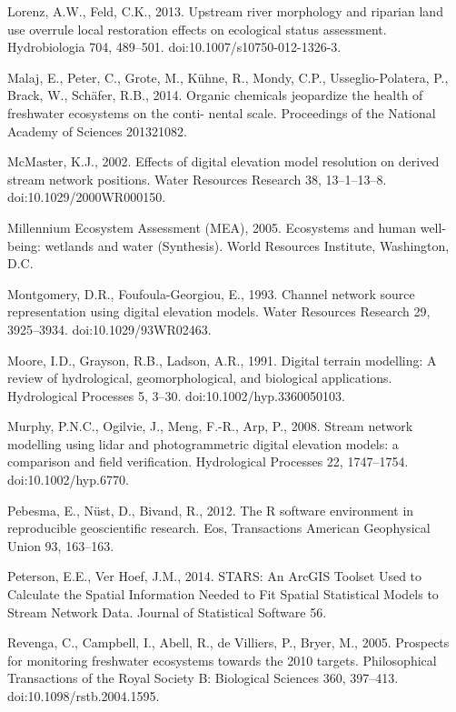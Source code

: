 \begin{thebibliography}
\bibitem{} \hangindent=1cm Lorenz, A.W., Feld, C.K., 2013. Upstream river morphology and riparian land use overrule local restoration effects on ecological status assessment. Hydrobiologia 704, 489–501. doi:10.1007/s10750-012-1326-3.

\bibitem{} \hangindent=1cm Malaj, E., Peter, C., Grote, M., Kühne, R., Mondy, C.P., Usseglio-Polatera, P., Brack, W., Schäfer, R.B., 2014. Organic chemicals jeopardize the health of freshwater ecosystems on the conti- nental scale. Proceedings of the National Academy of Sciences 201321082.

\bibitem{} \hangindent=1cm McMaster, K.J., 2002. Effects of digital elevation model resolution on derived stream network positions. Water Resources Research 38, 13–1–13–8. doi:10.1029/2000WR000150.

\bibitem{} \hangindent=1cm Millennium Ecosystem Assessment (MEA), 2005. Ecosystems and human well-being: wetlands and water (Synthesis). World Resources Institute, Washington, D.C.

\bibitem{} \hangindent=1cm Montgomery, D.R., Foufoula-Georgiou, E., 1993. Channel network source representation using digital elevation models. Water Resources Research 29, 3925–3934. doi:10.1029/93WR02463.

\bibitem{} \hangindent=1cm Moore, I.D., Grayson, R.B., Ladson, A.R., 1991. Digital terrain modelling: A review of hydrological, geomorphological, and biological applications. Hydrological Processes 5, 3–30. doi:10.1002/hyp.3360050103.

\bibitem{} \hangindent=1cm Murphy, P.N.C., Ogilvie, J., Meng, F.-R., Arp, P., 2008. Stream network modelling using lidar and photogrammetric digital elevation models: a comparison and field verification. Hydrological Processes 22, 1747–1754. doi:10.1002/hyp.6770.

\bibitem{} \hangindent=1cm Pebesma, E., Nüst, D., Bivand, R., 2012. The R software environment in reproducible geoscientific research. Eos, Transactions American Geophysical Union 93, 163–163.

\bibitem{} \hangindent=1cm Peterson, E.E., Ver Hoef, J.M., 2014. STARS: An ArcGIS Toolset Used to Calculate the Spatial Information Needed to Fit Spatial Statistical Models to Stream Network Data. Journal of Statistical Software 56.

\bibitem{} \hangindent=1cm Revenga, C., Campbell, I., Abell, R., de Villiers, P., Bryer, M., 2005. Prospects for monitoring freshwater ecosystems towards the 2010 targets. Philosophical Transactions of the Royal Society B: Biological Sciences 360, 397–413. doi:10.1098/rstb.2004.1595.


\end{thebibliography}

